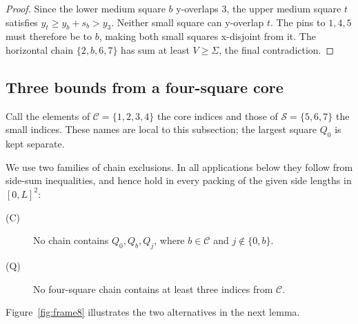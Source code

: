 \documentclass[12pt]{amsart}
\theoremstyle{definition}
\theoremstyle{remark}
\numberwithin{equation}{section}
\numberwithin{figure}{section}
\numberwithin{table}{section}
\begin{document}
\begin{proof}
Since the lower medium square $b$ y-overlaps $3$, the upper medium
square $t$ satisfies $y_t\ge y_b+s_b>y_3$. Neither small square can
y-overlap $t$. The pins to $1,4,5$ must therefore be to $b$,
making both small squares x-disjoint from it. The horizontal chain
$\{2,b,6,7\}$ has sum at least $V\ge\Sigma$, the final contradiction.
\end{proof}

\subsection{Three bounds from a four-square core}\label{sec:fourcore}
Call the elements
of $\mathcal C=\{1,2,3,4\}$ the core indices and those of
$\mathcal S=\{5,6,7\}$ the small indices. These names are local to
this subsection; the largest square \(Q_0\) is kept separate.

We use two families of chain exclusions. In all applications below they
follow from side-sum inequalities, and hence hold in every packing of the
given side lengths in $[0,L]^2$:
\begin{description}
\item[(C)] No chain contains \(Q_0,Q_b,Q_j\), where \(b\in\mathcal C\) and
\(j\notin\{0,b\}\).
\item[(Q)] No four-square chain contains at least three indices from
\(\mathcal C\).
\end{description}
Figure~\ref{fig:frame8} illustrates the two alternatives in the next lemma.
\end{document}
